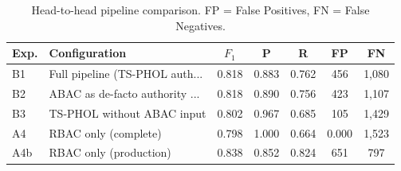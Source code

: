 \begin{table}[t]
\centering
\caption{Head-to-head pipeline comparison. FP = False Positives, FN = False Negatives.}
\label{tab:comparison}
\footnotesize
\begin{tabular}{@{}llccccc@{}}
\toprule
Exp. & Configuration & $F_1$ & P & R & FP & FN \\
\midrule
  B1 & Full pipeline (TS-PHOL auth... & 0.818 & 0.883 & 0.762 & 456 & 1,080 \\
  B2 & ABAC as de-facto authority ... & 0.818 & 0.890 & 0.756 & 423 & 1,107 \\
  B3 & TS-PHOL without ABAC input & 0.802 & 0.967 & 0.685 & 105 & 1,429 \\
  A4 & RBAC only (complete) & 0.798 & 1.000 & 0.664 & 0.000 & 1,523 \\
  A4b & RBAC only (production) & 0.838 & 0.852 & 0.824 & 651 & 797 \\
\bottomrule
\end{tabular}
\end{table}